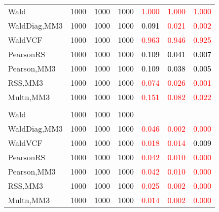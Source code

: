 \documentclass[
]{article}
\begin{document}
\begin{table}[H]
{\begin{tabular}[t]{lrrrrrr}
\hspace{1em}Wald & 1000 & 1000 & 1000 & \textcolor{red}{1.000} & \textcolor{red}{1.000} & \textcolor{red}{1.000}\\
\hspace{1em}WaldDiag,MM3 & 1000 & 1000 & 1000 & \textcolor{black}{0.091} & \textcolor{red}{0.021} & \textcolor{red}{0.002}\\
\hspace{1em}WaldVCF & 1000 & 1000 & 1000 & \textcolor{red}{0.963} & \textcolor{red}{0.946} & \textcolor{red}{0.925}\\
\hspace{1em}PearsonRS & 1000 & 1000 & 1000 & \textcolor{black}{0.109} & \textcolor{black}{0.041} & \textcolor{black}{0.007}\\
\hspace{1em}Pearson,MM3 & 1000 & 1000 & 1000 & \textcolor{black}{0.109} & \textcolor{black}{0.038} & \textcolor{black}{0.005}\\
\hspace{1em}RSS,MM3 & 1000 & 1000 & 1000 & \textcolor{red}{0.074} & \textcolor{red}{0.026} & \textcolor{red}{0.001}\\
\hspace{1em}Multn,MM3 & 1000 & 1000 & 1000 & \textcolor{red}{0.151} & \textcolor{red}{0.082} & \textcolor{red}{0.022}\\
\addlinespace[0.3em]
\multicolumn{7}{l}{\textbf{3F 15V}}\\
\hspace{1em}Wald & 1000 & 1000 & 1000 & \textcolor{black}{} & \textcolor{black}{} & \textcolor{black}{}\\
\hspace{1em}WaldDiag,MM3 & 1000 & 1000 & 1000 & \textcolor{red}{0.046} & \textcolor{red}{0.002} & \textcolor{red}{0.000}\\
\hspace{1em}WaldVCF & 1000 & 1000 & 1000 & \textcolor{red}{0.018} & \textcolor{red}{0.014} & \textcolor{black}{0.009}\\
\hspace{1em}PearsonRS & 1000 & 1000 & 1000 & \textcolor{red}{0.042} & \textcolor{red}{0.010} & \textcolor{red}{0.000}\\
\hspace{1em}Pearson,MM3 & 1000 & 1000 & 1000 & \textcolor{red}{0.042} & \textcolor{red}{0.010} & \textcolor{red}{0.000}\\
\hspace{1em}RSS,MM3 & 1000 & 1000 & 1000 & \textcolor{red}{0.025} & \textcolor{red}{0.002} & \textcolor{red}{0.000}\\
\hspace{1em}Multn,MM3 & 1000 & 1000 & 1000 & \textcolor{red}{0.014} & \textcolor{red}{0.002} & \textcolor{red}{0.000}\\
\bottomrule
\end{tabular}}
\endgroup{}
\end{table}
\end{document}
